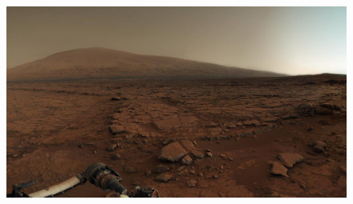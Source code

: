 \documentclass[aspectratio=169]{beamer}
\begin{document}
\begin{frame}[plain]
  \begin{figure}
  \centering
  \vspace*{-1em}
  \hspace*{-3em}
  \includegraphics[height=9.5cm,keepaspectratio]{figures/mars_surface.jpg}
  \end{figure}
\end{frame}
\end{document}
